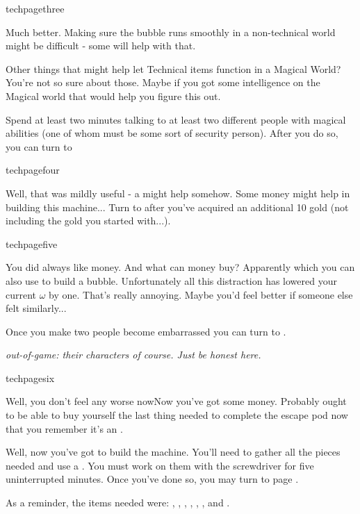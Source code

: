 \documentclass[greennotebook]{guildcamp3} %
\begin{document}
\begin{page}[good...]{techpagethree}
	
Much better. Making sure the bubble runs smoothly in a non-technical world might be difficult - some \iGraphiteLube{} will help with that. 

Other things that might help let Technical items function in a Magical World? You're not so sure about those. Maybe if you got some intelligence on the Magical world that would help you figure this out. 

Spend at least two minutes talking to at least two different people with magical abilities (one of whom must be some sort of security person). After you do so, you can turn to 

\end{page}

\begin{page}{techpagefour}
	
Well, that was mildly useful - a \iFlashlight{} might help somehow. Some money might help in building this machine... Turn to  after you've acquired an additional 10 gold (not including the gold you started with...).
	
\end{page}

\begin{page}{techpagefive}

You did always like money. And what can money buy? Apparently \iNiobiumCarbide{} which you can also use to build a bubble. Unfortunately all this distraction has lowered your current $\omega$ by one. That's really annoying. Maybe you'd feel better if someone else felt similarly...

Once you make two people become embarrassed you can turn to  .

\emph{out-of-game: their characters of course. Just be honest here.}
	
\end{page}

\begin{page}{techpagesix}
	
Well, you don't feel any worse nowNow you've got some money. Probably ought to be able to buy yourself the last thing needed to complete the escape pod now that you remember it's an \iTransistor{}. 

Well, now you've got to build the machine. You'll need to gather all the pieces needed and use a \iScrewdriver{}. You must work on them with the screwdriver for five uninterrupted minutes. Once you've done so, you may turn to page . 

As a reminder, the items needed were: \iScrapMetal{}, \iCircuitBoard{}, \iCog{}, \iGraphiteLube{}, \iFlashlight{}, \iNiobiumCarbide{}, and \iTransistor{}. 
	
\end{page}	
\end{document}
